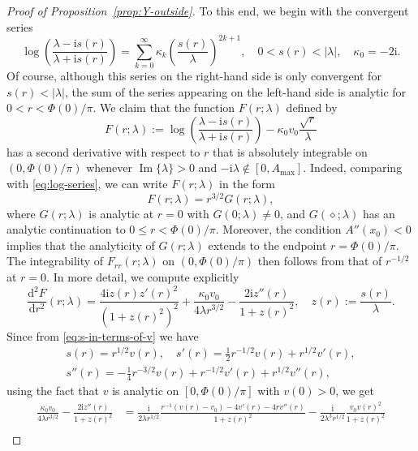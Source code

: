 \documentclass[12pt]{amsart}
\numberwithin{equation}{section}
\newcommand{\dd}{\mathrm{d}}
\newcommand{\ii}{\mathrm{i}}
\newcommand{\SP}{\lambda}
\newcommand{\phaseint}{\Phi}
\newcommand{\rr}{r}
\DeclareMathOperator{\imag}{Im}
\begin{document}
\begin{proof}[Proof of Proposition~\ref{prop:Y-outside}]
To this end, we begin with the convergent series
\begin{equation}
\log\left(\frac{\SP-\ii s(\rr)}{\SP+\ii s(\rr)}\right)=\sum_{k=0}^\infty \kappa_k\left(\frac{s(\rr)}{\SP}\right)^{2k+1},\quad 0<s(\rr)<|\SP|,\quad\kappa_0=-2\ii.
\label{eq:log-series}
\end{equation}
Of course, although this series on the right-hand side is only convergent for $s(\rr)<|\SP|$, the sum of the series appearing on the left-hand side is analytic 
for $0<\rr<\phaseint(0)/\pi$.  We claim that the function $F(\rr;\SP)$ defined by
\begin{equation}
F(\rr;\SP):=\log\left(\frac{\SP-\ii s(\rr)}{\SP+\ii s(\rr)}\right)-\kappa_0v_0\frac{\sqrt{\rr}}{\SP}
\label{eq:F-t-zeta}
\end{equation}
has a second derivative with respect to $\rr$ that is absolutely integrable on $(0,\phaseint(0)/\pi)$ whenever $\imag\{\SP\}>0$ and $-\ii \SP\not\in [0,A_\mathrm{max}]$.   Indeed, comparing with \eqref{eq:log-series}, we can write $F(\rr;\SP)$ in the form
\begin{equation}
F(\rr;\SP)=\rr^{3/2}G(\rr;\SP),
\end{equation}
where $G(\rr;\SP)$ is analytic at $\rr=0$ with $G(0;\SP)\neq 0$, and $G(\diamond;\SP)$ has an analytic continuation to $0\le \rr<\phaseint(0)/\pi$.  Moreover, the condition $A''(x_0)<0$ implies that the analyticity of $G(\rr;\SP)$
extends to the endpoint $\rr=\phaseint(0)/\pi$.  The integrability of $F_{\rr\rr}(\rr;\SP)$ on $(0,\phaseint(0)/\pi)$ then follows from that of $\rr^{-1/2}$ at $\rr=0$.  In more detail, 
we compute explicitly
\begin{equation}
\frac{\dd^2F}{\dd \rr^2}(\rr;\SP)=\frac{4\ii z(\rr)z'(\rr)^2}{(1+z(\rr)^2)^2}+\frac{\kappa_0v_0}{4\SP \rr^{3/2}}-\frac{2\ii z''(\rr)}{1+z(\rr)^2},\quad z(\rr):=\frac{s(\rr)}{\SP}.
\end{equation}
Since from \eqref{eq:s-in-terms-of-v} we have
\begin{gather}
s(\rr)=\rr^{1/2}v(\rr),\quad s'(\rr)=\tfrac{1}{2}\rr^{-1/2}v(\rr)+\rr^{1/2}v'(\rr),\\
s''(\rr)=-\tfrac{1}{4}\rr^{-3/2}v(\rr)+\rr^{-1/2}v'(\rr)+\rr^{1/2}v''(\rr),  \nonumber
\end{gather}
using the fact that $v$ is analytic on $[0,\phaseint(0)/\pi]$ with $v(0)>0$, we get
\begin{equation}
\begin{split}
\frac{\kappa_0v_0}{4\SP \rr^{3/2}}-\frac{2\ii z''(\rr)}{1+z(\rr)^2}&=
\frac{\ii}{2\SP \rr^{1/2}}\frac{\rr^{-1}(v(\rr)-v_0)-4v'(\rr)-4\rr v''(\rr)}{1+z(\rr)^2}-\frac{\ii}{2\SP^3\rr^{1/2}}\frac{v_0v(\rr)^2}{1+z(\rr)^2}\\

\end{split}
\end{equation}
\end{proof}
\end{document}
